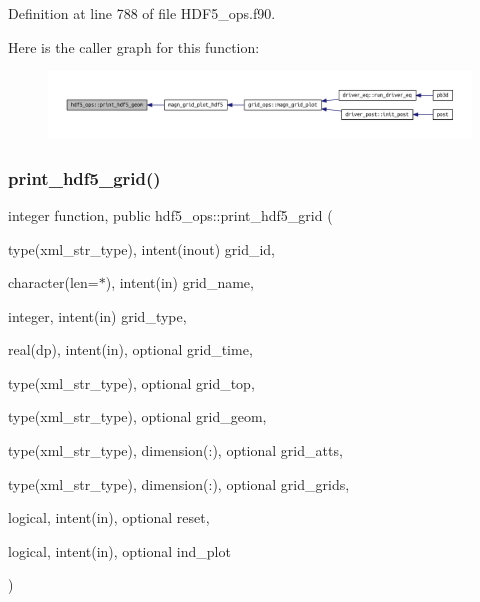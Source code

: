Definition at line 788 of file H\+D\+F5\+\_\+ops.\+f90.

Here is the caller graph for this function\+:
\nopagebreak
\begin{figure}[H]
\begin{center}
\leavevmode
\includegraphics[width=350pt]{namespacehdf5__ops_ac23a71e7029f46e5f38a95468fc10e22_icgraph}
\end{center}
\end{figure}
\mbox{\label{namespacehdf5__ops_a144d595445778d89ec1a1bc0b12a94fb}} 
\subsubsection{\texorpdfstring{print\+\_\+hdf5\+\_\+grid()}{print\_hdf5\_grid()}}
{\footnotesize\ttfamily integer function, public hdf5\+\_\+ops\+::print\+\_\+hdf5\+\_\+grid (\begin{DoxyParamCaption}\item[{type(xml\+\_\+str\+\_\+type), intent(inout)}]{grid\+\_\+id,  }\item[{character(len=$\ast$), intent(in)}]{grid\+\_\+name,  }\item[{integer, intent(in)}]{grid\+\_\+type,  }\item[{real(dp), intent(in), optional}]{grid\+\_\+time,  }\item[{type(xml\+\_\+str\+\_\+type), optional}]{grid\+\_\+top,  }\item[{type(xml\+\_\+str\+\_\+type), optional}]{grid\+\_\+geom,  }\item[{type(xml\+\_\+str\+\_\+type), dimension(\+:), optional}]{grid\+\_\+atts,  }\item[{type(xml\+\_\+str\+\_\+type), dimension(\+:), optional}]{grid\+\_\+grids,  }\item[{logical, intent(in), optional}]{reset,  }\item[{logical, intent(in), optional}]{ind\+\_\+plot }\end{DoxyParamCaption})}



